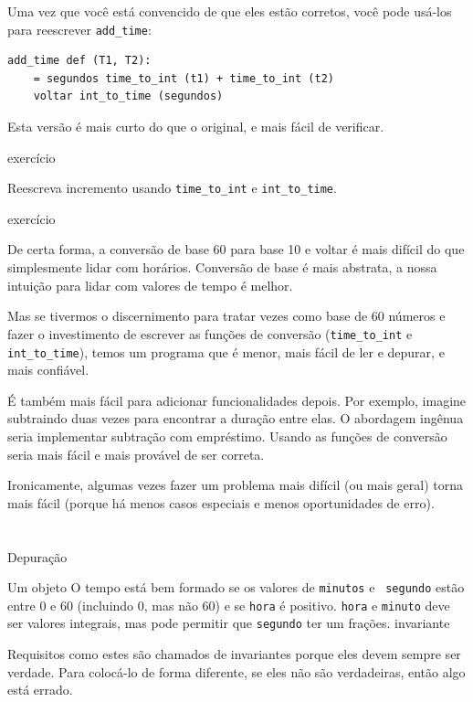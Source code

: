 \documentclass[10pt]{book}
\begin{document}
\begin{v erbatim}
{Uma vez que você está convencido de que eles estão corretos, você pode usá-los para 
reescrever \verb "add_time":

\begin{verbatim}
add_time def (T1, T2):
    = segundos time_to_int (t1) + time_to_int (t2)
    voltar int_to_time (segundos)
\end{verbatim}
%
Esta versão é mais curto do que o original, e mais fácil de verificar.

\begin{} exercício

Reescreva {incremento \tt} usando \verb "time_to_int" e \verb "int_to_time".

\end{} exercício

De certa forma, a conversão de base 60 para base 10 e voltar é mais difícil
do que simplesmente lidar com horários. Conversão de base é mais abstrata, a nossa
intuição para lidar com valores de tempo é melhor.

Mas se tivermos o discernimento para tratar vezes como base de 60 números e fazer
o investimento de escrever as funções de conversão (\verb "time_to_int"
e \verb "int_to_time"), temos um programa que é menor, mais fácil de
ler e depurar, e mais confiável.

É também mais fácil para adicionar funcionalidades depois. Por exemplo, imagine
subtraindo duas vezes para encontrar a duração entre elas. O
abordagem ingênua seria implementar subtração com empréstimo.
Usando as funções de conversão seria mais fácil e mais provável de ser
correta.

Ironicamente, algumas vezes fazer um problema mais difícil (ou mais geral) torna
mais fácil (porque há menos casos especiais e menos oportunidades
de erro).


\section{} Depuração

Um objeto O tempo está bem formado se os valores de {\tt minutos} e {\tt
segundo} estão entre 0 e 60 (incluindo 0, mas não 60) e se 
{\tt hora} é positivo. {\tt hora} e {\tt minuto} deve ser
valores integrais, mas pode permitir que {\tt segundo} ter um
frações.
\index{} invariante

Requisitos como estes são chamados de invariantes {\bf} porque
eles devem sempre ser verdade. Para colocá-lo de forma diferente, se eles
não são verdadeiras, então algo está errado.

}
\end{v erbatim}
\end{document}
